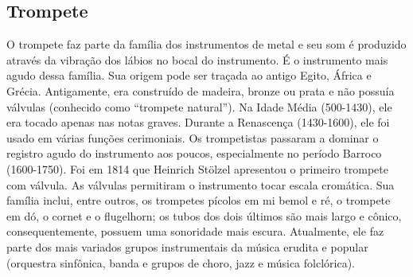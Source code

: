 \subsection*{Trompete}

O trompete faz parte da família dos instrumentos de metal e
seu som é produzido através da vibração dos lábios no bocal do
instrumento. É o instrumento mais agudo dessa família. Sua origem pode
ser traçada ao antigo Egito, África e Grécia. Antigamente, era
construído de madeira, bronze ou prata e não possuía válvulas
(conhecido como “trompete natural”). Na Idade Média (500-1430), ele
era tocado apenas nas notas graves. Durante a Renascença (1430-1600),
ele foi usado em várias funções cerimoniais. Os trompetistas passaram
a dominar o registro agudo do instrumento aos poucos, especialmente no
período Barroco (1600-1750). Foi em 1814 que Heinrich Stölzel
apresentou o primeiro trompete com válvula. As válvulas permitiram o
instrumento tocar escala cromática. Sua família inclui, entre outros,
os trompetes pícolos em mi bemol e ré, o trompete em dó, o cornet e o
flugelhorn; os tubos dos dois últimos são mais largo e cônico,
consequentemente, possuem uma sonoridade mais escura. Atualmente, ele
faz parte dos mais variados grupos instrumentais da música erudita e
popular (orquestra sinfônica, banda e grupos de choro, jazz e música
folclórica).